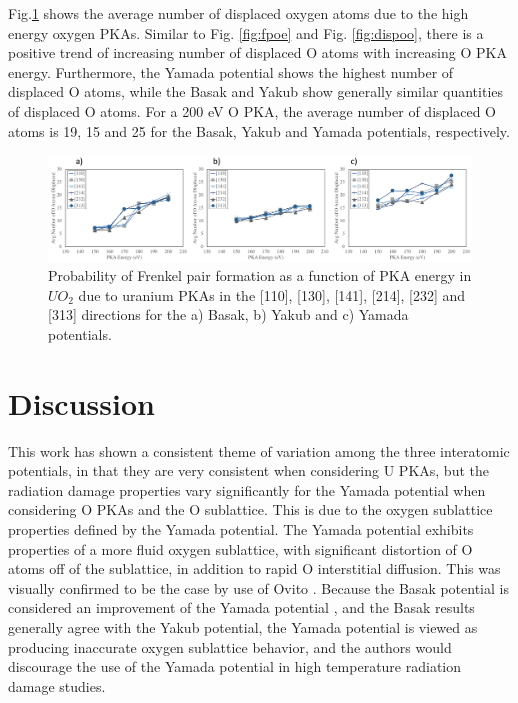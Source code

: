 \documentclass[8pt]{article}   	%
\begin{document}
Fig.\ref{fig:dispoe} shows the average number of displaced oxygen atoms due to the high energy oxygen PKAs. Similar to Fig. \ref{fig:fpoe} and Fig. \ref{fig:dispoo}, there is a positive trend of increasing number of displaced O atoms with increasing O PKA energy. Furthermore, the Yamada potential shows the highest number of displaced O atoms, while the Basak and Yakub show generally similar quantities of displaced O atoms. For a 200 eV O PKA, the average number of displaced O atoms is 19, 15 and 25 for the Basak, Yakub and Yamada potentials, respectively.

\begin{figure}[h]
 \centering
 \includegraphics[width=1.0\textwidth]{dispO_OE.png} 
 \caption{Probability of Frenkel pair formation as a function of PKA energy in $UO_2$ due to uranium PKAs in the [110], [130], [141], [214], [232] and [313] directions for the a) Basak, b) Yakub and c) Yamada potentials.  }
 \label{fig:dispoe}
\end{figure}


\section{Discussion}

This work has shown a consistent theme of variation among the three interatomic potentials, in that they are very consistent when considering U PKAs, but the radiation damage properties vary significantly for the Yamada potential when considering O PKAs and the O sublattice. This is due to the oxygen sublattice properties defined by the Yamada potential. The Yamada potential exhibits properties of a more fluid oxygen sublattice, with significant distortion of O atoms off of the sublattice, in addition to rapid O interstitial diffusion. This was visually confirmed to be the case by use of Ovito \cite{ovito}. Because the Basak potential is considered an improvement of the Yamada potential \cite{basak}, and the Basak results generally agree with the Yakub potential, the Yamada potential is viewed as producing inaccurate oxygen sublattice behavior, and the authors would discourage the use of the Yamada potential in high temperature radiation damage studies. 
\end{document}
